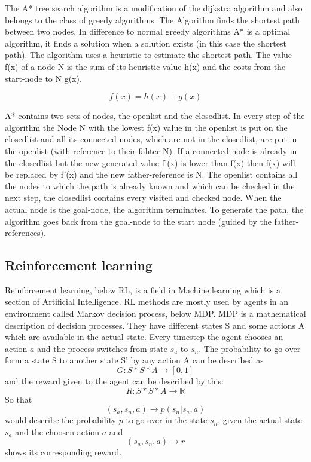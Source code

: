 The A* tree search algorithm is a modification of the dijkstra algorithm and also belongs to the class of greedy algorithms. The Algorithm finds the shortest path between two nodes. In difference to normal greedy algorithms A* is a optimal algorithm, it finds a solution when a solution exists (in this case the shortest path). The algorithm uses a heuristic to estimate the shortest path. The value f(x) of a node N is the sum of its heuristic value h(x) and the costs from the start-node to N g(x).

\[
	f(x)=h(x)+g(x)
\]   

A* contains two sets of nodes, the openlist and the closedlist. In every step of the algorithm the Node N with the lowest f(x) value in the openlist is put on the closedlist and all its connected nodes, which are not in the closedlist, are put in the openlist (with reference to their fahter N). If a connected node is already in the closedlist but the new generated value f'(x) is lower than f(x) then f(x) will be replaced by f'(x) and the new father-reference is N. The openlist contains all the nodes to which the path is already known and which can be checked in the next step, the closedlist contains every visited and checked node. When the actual node is the goal-node, the algorithm terminates. To generate the path, the algorithm goes back from the goal-node to the start node (guided by the father-references). 

\subsection{Reinforcement learning} 
 
Reinforcement learning, below RL, is a field in Machine learning which is a section of Artificial Intelligence. RL methods are mostly used by agents in an environment called Markov decision process, below MDP. MDP is a mathematical description of decision processes. They have different states S and some actions A which are available in the actual state. Every timestep the agent chooses an action $a$ and the process switches from state $s_a$ to $s_n$. The probability to go over form a state S to another state S' by any action A can be described as
\[
	G: S*S*A \rightarrow [0,1] 
\] 
and the reward given to the agent can be described by this:
\[
	R: S*S*A \rightarrow \mathbb{R}
\]
So that
\[
	(s_a, s_n, a) \rightarrow p(s_n|s_a, a)
\]
would describe the probability $p$ to go over in the state $s_n$, given the actual state $s_a$ and the choosen action $a$ and 
\[
	(s_a, s_n, a) \rightarrow r
\]
shows its corresponding reward.  



